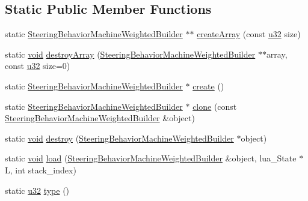 \subsection*{Static Public Member Functions}
\begin{DoxyCompactItemize}
\item 
static \mbox{\hyperlink{classnjli_1_1_steering_behavior_machine_weighted_builder}{Steering\+Behavior\+Machine\+Weighted\+Builder}} $\ast$$\ast$ \mbox{\hyperlink{classnjli_1_1_steering_behavior_machine_weighted_builder_a187542b0a31cc014a355dfd77f7f56a5}{create\+Array}} (const \mbox{\hyperlink{_util_8h_a10e94b422ef0c20dcdec20d31a1f5049}{u32}} size)
\item 
static \mbox{\hyperlink{_thread_8h_af1e856da2e658414cb2456cb6f7ebc66}{void}} \mbox{\hyperlink{classnjli_1_1_steering_behavior_machine_weighted_builder_afd40caa65c110c3c5183e1bae7e2ffe9}{destroy\+Array}} (\mbox{\hyperlink{classnjli_1_1_steering_behavior_machine_weighted_builder}{Steering\+Behavior\+Machine\+Weighted\+Builder}} $\ast$$\ast$array, const \mbox{\hyperlink{_util_8h_a10e94b422ef0c20dcdec20d31a1f5049}{u32}} size=0)
\item 
static \mbox{\hyperlink{classnjli_1_1_steering_behavior_machine_weighted_builder}{Steering\+Behavior\+Machine\+Weighted\+Builder}} $\ast$ \mbox{\hyperlink{classnjli_1_1_steering_behavior_machine_weighted_builder_a8ddc9325c307cf5fc3f337bd26449fca}{create}} ()
\item 
static \mbox{\hyperlink{classnjli_1_1_steering_behavior_machine_weighted_builder}{Steering\+Behavior\+Machine\+Weighted\+Builder}} $\ast$ \mbox{\hyperlink{classnjli_1_1_steering_behavior_machine_weighted_builder_a94bd181b23d367f3f3925f6d3371a315}{clone}} (const \mbox{\hyperlink{classnjli_1_1_steering_behavior_machine_weighted_builder}{Steering\+Behavior\+Machine\+Weighted\+Builder}} \&object)
\item 
static \mbox{\hyperlink{_thread_8h_af1e856da2e658414cb2456cb6f7ebc66}{void}} \mbox{\hyperlink{classnjli_1_1_steering_behavior_machine_weighted_builder_a3681cb76419a3a9bbef5f883f3a96c56}{destroy}} (\mbox{\hyperlink{classnjli_1_1_steering_behavior_machine_weighted_builder}{Steering\+Behavior\+Machine\+Weighted\+Builder}} $\ast$object)
\item 
static \mbox{\hyperlink{_thread_8h_af1e856da2e658414cb2456cb6f7ebc66}{void}} \mbox{\hyperlink{classnjli_1_1_steering_behavior_machine_weighted_builder_a413e48f02cae5ce70d2e1ed5cb54cde5}{load}} (\mbox{\hyperlink{classnjli_1_1_steering_behavior_machine_weighted_builder}{Steering\+Behavior\+Machine\+Weighted\+Builder}} \&object, lua\+\_\+\+State $\ast$L, int stack\+\_\+index)
\item 
static \mbox{\hyperlink{_util_8h_a10e94b422ef0c20dcdec20d31a1f5049}{u32}} \mbox{\hyperlink{classnjli_1_1_steering_behavior_machine_weighted_builder_a2199932c63e8817d99734ba34d6107e2}{type}} ()
\end{DoxyCompactItemize}
